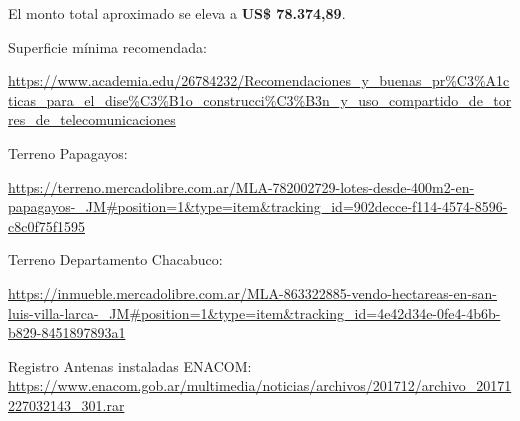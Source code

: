 El monto total aproximado se eleva a \textbf{US\$ 78.374,89}.







\newpage


\begin{thebibliography}{99}
Superficie mínima recomendada: \begin{tiny}
\url{https://www.academia.edu/26784232/Recomendaciones_y_buenas_pr\%C3\%A1cticas_para_el_dise\%C3\%B1o_construcci\%C3\%B3n_y_uso_compartido_de_torres_de_telecomunicaciones}
\end{tiny}

Terreno Papagayos: \begin{tiny}
\url{https://terreno.mercadolibre.com.ar/MLA-782002729-lotes-desde-400m2-en-papagayos-_JM#position=1&type=item&tracking_id=902decce-f114-4574-8596-c8c0f75f1595}
\end{tiny}



Terreno Departamento Chacabuco:  \begin{tiny}
\url{https://inmueble.mercadolibre.com.ar/MLA-863322885-vendo-hectareas-en-san-luis-villa-larca-_JM#position=1&type=item&tracking_id=4e42d34e-0fe4-4b6b-b829-8451897893a1}
\end{tiny}


 Registro Antenas instaladas ENACOM: \url{https://www.enacom.gob.ar/multimedia/noticias/archivos/201712/archivo_20171227032143_301.rar}


\end{thebibliography}
